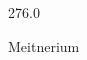\documentclass[12pt]{article}
\begin{document}
\hfill{}
\vfill
\begin{center}
  {\fontsize{50}{60}
  }

  \vspace{1em}

  276.0

Meitnerium
\end{center}
\vfill
\end{document}
